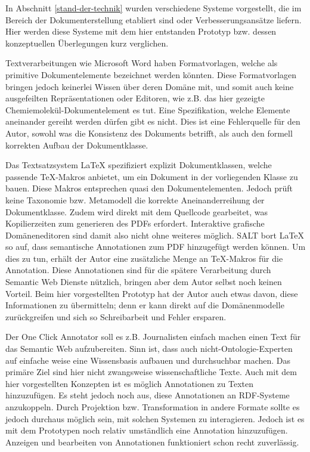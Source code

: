 In Abschnitt \ref{stand-der-technik} wurden verschiedene Systeme vorgestellt, die im Bereich der Dokumenterstellung etabliert sind oder Verbesserungsansätze liefern. Hier werden diese Systeme mit dem hier entstanden Prototyp bzw. dessen konzeptuellen Überlegungen kurz verglichen.

 
Textverarbeitungen wie Microsoft Word haben Formatvorlagen, welche als primitive Dokumentelemente bezeichnet werden könnten. Diese Formatvorlagen bringen jedoch keinerlei Wissen über deren Domäne mit, und somit auch keine ausgefeilten Repräsentationen oder Editoren, wie z.B. das hier gezeigte Chemiemolekül-Dokumentelement es tut. Eine Spezifikation, welche Elemente aneinander gereiht werden dürfen gibt es nicht. Dies ist eine Fehlerquelle für den Autor, sowohl was die Konsistenz des Dokuments betrifft, als auch den formell korrekten Aufbau der Dokumentklasse.

 
Das Textsatzsystem LaTeX spezifiziert explizit Dokumentklassen, welche passende TeX-Makros anbietet, um ein Dokument in der vorliegenden Klasse zu bauen. Diese Makros entsprechen quasi den Dokumentelementen. Jedoch prüft keine Taxonomie bzw. Metamodell die korrekte Aneinanderreihung der Dokumentklasse. Zudem wird direkt mit dem Quellcode gearbeitet, was Kopilierzeiten zum generieren des PDFs erfordert. Interaktive grafische Domäneneditoren sind damit also nicht ohne weiteres möglich. SALT \citep{Groza} bort LaTeX so auf, dass semantische Annotationen zum PDF hinzugefügt werden können. Um dies zu tun, erhält der Autor eine zusätzliche Menge an TeX-Makros für die Annotation. Diese Annotationen sind für die spätere Verarbeitung durch Semantic Web Dienste nützlich, bringen aber dem Autor selbst noch keinen Vorteil. Beim hier vorgestellten Prototyp hat der Autor auch etwas davon, diese Informationen zu übermitteln; denn er kann direkt auf die Domänenmodelle zurückgreifen und sich so Schreibarbeit und Fehler ersparen.

 
Der One Click Annotator \citep{Heese} soll es z.B. Journalisten einfach machen einen Text für das Semantic Web aufzubereiten. Sinn ist, dass auch nicht-Ontologie-Experten auf einfache weise eine Wissensbasis aufbauen und durchsuchbar machen. Das primäre Ziel sind hier nicht zwangsweise wissenschaftliche Texte. Auch mit dem hier vorgestellten Konzepten ist es möglich Annotationen zu Texten hinzuzufügen. Es steht jedoch noch aus, diese Annotationen an RDF-Systeme anzukoppeln. Durch Projektion bzw. Transformation in andere Formate sollte es jedoch durchaus möglich sein, mit solchen Systemen zu interagieren. Jedoch ist es mit dem Prototypen noch relativ umständlich eine Annotation hinzuzufügen. Anzeigen und bearbeiten von Annotationen funktioniert schon recht zuverlässig.

